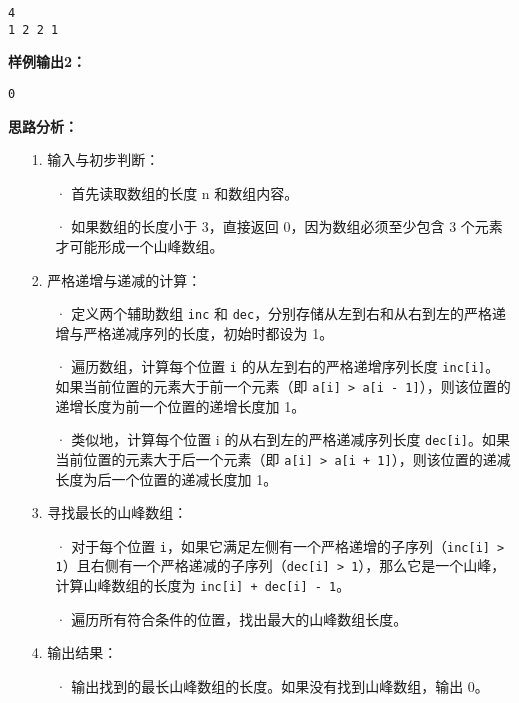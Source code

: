 \documentclass[a4paper]{ctexart}
\begin{document}
\lstset{numbers=none}
\begin{lstlisting}
4
1 2 2 1
\end{lstlisting}
\lstset{numbers=left}
	
\noindent\textbf{样例输出2：}
\lstset{numbers=none}
\begin{lstlisting}
0
\end{lstlisting}
\lstset{numbers=left}
	
\vspace{10pt}
	
\noindent\textbf{思路分析：}
\begin{itemize}
	\item[1.] 输入与初步判断：
		\begin{itemize}
			\item[·] 首先读取数组的长度 n 和数组内容。
			
			\item[·] 如果数组的长度小于 3，直接返回 0，因为数组必须至少包含 3 个元素才可能形成一个山峰数组。
		\end{itemize}
	
	\item[2.] 严格递增与递减的计算：
		\begin{itemize}
			\item[·] 定义两个辅助数组 \texttt{inc} 和 \texttt{dec}，分别存储从左到右和从右到左的严格递增与严格递减序列的长度，初始时都设为 1。
			
			\item[·] 遍历数组，计算每个位置 \texttt{i} 的从左到右的严格递增序列长度 \texttt{inc[i]}。如果当前位置的元素大于前一个元素（即 \texttt{a[i] > a[i - 1]}），则该位置的递增长度为前一个位置的递增长度加 1。
			
			\item[·] 类似地，计算每个位置 i 的从右到左的严格递减序列长度 \texttt{dec[i]}。如果当前位置的元素大于后一个元素（即 \texttt{a[i] > a[i + 1]}），则该位置的递减长度为后一个位置的递减长度加 1。
		\end{itemize}
	
	\item[3.] 寻找最长的山峰数组：
		\begin{itemize}
			\item[·] 对于每个位置 \texttt{i}，如果它满足左侧有一个严格递增的子序列（\texttt{inc[i] > 1}）且右侧有一个严格递减的子序列（\texttt{dec[i] > 1}），那么它是一个山峰，计算山峰数组的长度为 \texttt{inc[i] + dec[i] - 1}。
			\item[·] 遍历所有符合条件的位置，找出最大的山峰数组长度。
		\end{itemize}
	
	\item[4.] 输出结果：
		\begin{itemize}
		\item[·] 输出找到的最长山峰数组的长度。如果没有找到山峰数组，输出 0。
		\end{itemize}
\end{itemize}
	
\end{document}
